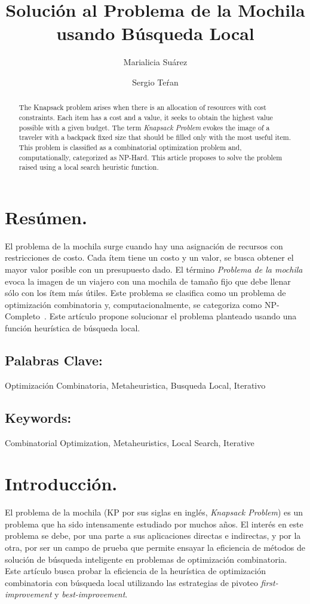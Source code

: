 \documentclass{ci5652}
\title{Solución al Problema de la Mochila usando Búsqueda Local}
\author{Marialicia Suárez
        \and
        Sergio Teŕan}
\begin{document}
\thispagestyle{empty}
\maketitle


\section*{Resúmen.}
	El problema de la mochila surge cuando hay una asignación de recursos con restricciones de costo. Cada ítem tiene un costo y un valor, se busca obtener el mayor valor posible con un presupuesto dado. El término \textit{Problema de la mochila} evoca la imagen de un viajero con una mochila de tamaño fijo que debe llenar sólo con los ítem más útiles. Este problema se clasifica como un problema de optimización combinatoria y, computacionalmente, se categoriza como NP-Completo~\cite{c_resumen_01}. Este artículo propone solucionar el problema planteado usando una función heurística de búsqueda local.

	\subsection*{Palabras Clave:}
	Optimización Combinatoria, Metaheuristica, Busqueda Local, Iterativo 

\begin{abstract}
	The Knapsack problem arises when there is an allocation of resources with cost constraints. Each item has a cost and a value, it seeks to obtain the highest value possible with a given budget. The term \textit{Knapsack Problem} evokes the image of a traveler with a backpack fixed size that should be filled only with the most useful item. This problem is classified as a combinatorial optimization problem and, computationally, categorized as NP-Hard. This article proposes to solve the problem raised using a local search heuristic function.
\end{abstract}

	\subsection*{Keywords:}
	Combinatorial Optimization, Metaheuristics, Local Search, Iterative

\section{Introducción.}

	El problema de la mochila (KP por sus siglas en inglés, \textit{Knapsack Problem}) es un problema que ha sido intensamente estudiado por muchos años. El interés en este problema se debe, por una parte a sus aplicaciones directas e indirectas, y por la otra, por ser un campo de prueba que permite ensayar la eficiencia de métodos de solución de búsqueda inteligente en problemas de optimización combinatoria. \\
	Este artículo busca probar la eficiencia de la heurística de optimización combinatoria con búsqueda local utilizando las estrategias de pivoteo \textit{first-improvement} y \textit{best-improvement}.
\end{document}
